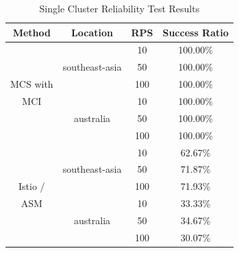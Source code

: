 \begin{table}[h]
\centering
\caption{Single Cluster Reliability Test Results}

\begin{tabular}{|c|c|c|c|}
\hline

\textbf{Method} & \textbf{Location} & \textbf{RPS} & \textbf{Success Ratio} \\ \hline

 & & 10 & 100.00\% \\ \cline{3-4}
 & southeast-asia & 50 & 100.00\% \\ \cline{3-4}
MCS with & & 100 & 100.00\% \\ \cline{2-4}
MCI & & 10 & 100.00\% \\ \cline{3-4}
 & australia & 50 & 100.00\% \\ \cline{3-4}
 & & 100 & 100.00\% \\ \hline
 & & 10 & 62.67\% \\ \cline{3-4}
 & southeast-asia & 50 & 71.87\% \\ \cline{3-4}
Istio / & & 100 & 71.93\% \\ \cline{2-4}
ASM & & 10 & 33.33\% \\ \cline{3-4}
 & australia & 50 & 34.67\% \\ \cline{3-4}
 & & 100 & 30.07\% \\ \hline

\end{tabular}
\label{tab:reliability-single-cluster-results}
\end{table}

